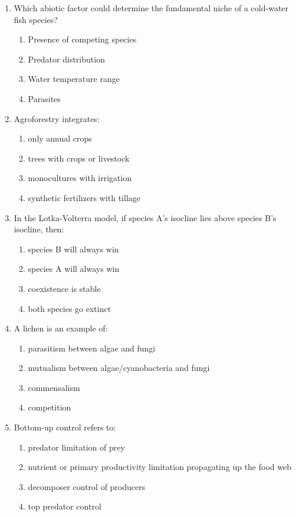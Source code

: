 \documentclass[11pt]{article}
\begin{document}
\begin{enumerate}[label=\textbf{\arabic*.}]
\item Which abiotic factor could determine the fundamental niche of a cold-water fish species?
\begin{enumerate}[label=\Alph*.]
  \item Presence of competing species
  \item Predator distribution
  \item Water temperature range
  \item Parasites
\end{enumerate}

\item Agroforestry integrates:
\begin{enumerate}[label=\Alph*.]
  \item only annual crops
  \item trees with crops or livestock
  \item monocultures with irrigation
  \item synthetic fertilizers with tillage
\end{enumerate}

\item In the Lotka-Volterra model, if species A's isocline lies above species B's isocline, then:
\begin{enumerate}[label=\Alph*.]
  \item species B will always win
  \item species A will always win
  \item coexistence is stable
  \item both species go extinct
\end{enumerate}

\item A lichen is an example of:
\begin{enumerate}[label=\Alph*.]
  \item parasitism between algae and fungi
  \item mutualism between algae/cyanobacteria and fungi
  \item commensalism
  \item competition
\end{enumerate}

\item Bottom-up control refers to:
\begin{enumerate}[label=\Alph*.]
  \item predator limitation of prey
  \item nutrient or primary productivity limitation propagating up the food web
  \item decomposer control of producers
  \item top predator control
\end{enumerate}


\end{enumerate}
\end{document}
